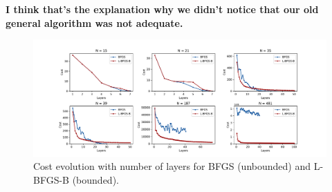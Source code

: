 \documentclass[12pt, letterpaper]{article}
\begin{document}
\textbf{I think that's the explanation why we didn't notice that our old general algorithm was not adequate.}

\begin{figure}[h]
    \centering
    \includegraphics[width=1\textwidth]{unbounded_cost_evolution.pdf}
    \caption{Cost evolution with number of layers for BFGS (unbounded) and
    L-BFGS-B (bounded).}
    \label{fig:unbounded_cost_evolution}
\end{figure}
\end{document}
